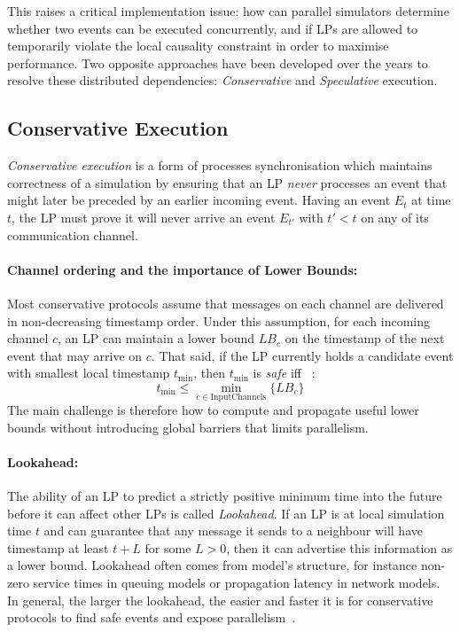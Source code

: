This raises a critical implementation issue: how can parallel simulators
determine whether two events can be executed concurrently, and if \ac{LP}s are
allowed to temporarily violate the local causality constraint in order to
maximise performance. Two opposite approaches have been developed over the
years to resolve these distributed dependencies: \emph{Conservative} and
\emph{Speculative} execution.

\subsection{Conservative Execution}\label{ssec:conservative_pdes}
\emph{Conservative execution} is a form of processes synchronisation which
maintains correctness of a simulation by ensuring that an \ac{LP} \emph{never}
processes an event that might later be preceded by an earlier incoming event.
Having an event $E_t$ at time $t$, the \ac{LP} must prove it will never arrive
an event $E_{t'}$ with $t' < t$ on any of its communication channel.

\paragraph{Channel ordering and the importance of Lower Bounds:} Most
conservative protocols assume that messages on each channel are delivered in
non-decreasing timestamp order. Under this assumption, for each incoming channel
$c$, an \ac{LP} can maintain a lower bound $LB_c$ on the timestamp of the
next event that may arrive on $c$.
That said, if the \ac{LP} currently holds a candidate event with smallest
local timestamp $t_{\text{min}}$, then $t_{\text{min}}$ is \emph{safe} iff ~\cite{fujimoto1999Pads}:
\begin{equation}
	t_{\text{min}} \leq \min_{c \in \text{InputChannels}} \{LB_c\}
\end{equation}
The main challenge is therefore how to compute and propagate useful lower
bounds without introducing global barriers that limits parallelism.

\paragraph{Lookahead:} The ability of an \ac{LP} to predict a strictly
positive minimum time into the future before it can affect other \ac{LP}s
is called \emph{Lookahead}. If an \ac{LP} is at local simulation time
$t$ and can guarantee that any message it sends to a neighbour will have
timestamp at least $t + L$ for some $L > 0$, then it can advertise this
information as a lower bound. Lookahead often comes from model's structure, for
instance non-zero service times in queuing models or propagation latency in
network models. In general, the larger the lookahead, the easier and faster it
is for conservative protocols to find safe events and expose
parallelism~\cite{fujimoto1988LPDES}.

